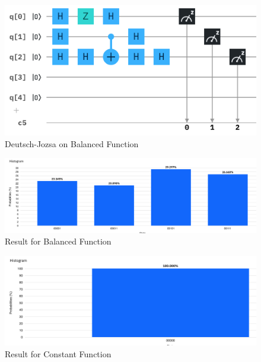 \documentclass[12pt]{article}
\begin{document}
\begin{figure}[ht]
\begin{minipage}{0.35\linewidth}
            \end{minipage}%
            \begin{minipage}{0.65\linewidth}
                \includegraphics[width=\linewidth]{Circuits/Deutsch-Jozsa.png}
            \end{minipage}
            \caption{Deutsch-Jozsa on Balanced Function}
        \end{figure}
        \begin{figure}[ht]
            \centering
            \includegraphics[width=\linewidth]{Circuits/Deutsch-Jozsa-result.png}
            \caption{Result for Balanced Function}
        \end{figure}
        \begin{figure}
            \centering
            \includegraphics[width=0.6\linewidth]{Circuits/Deutsch-Jozsa-result2.png}
            \caption{Result for Constant Function}
        \end{figure}
\end{document}
